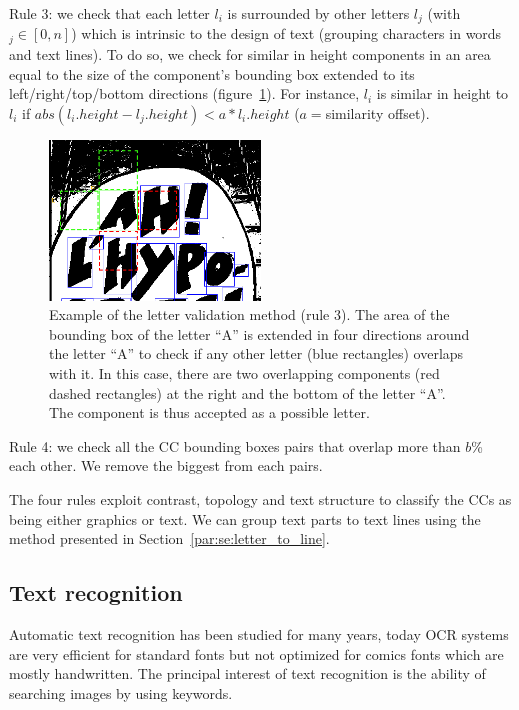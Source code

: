 Rule 3: we check that each letter $l_i$ is surrounded by other letters $l_j$ (with $_j\in{[0,n]}$) which is intrinsic to the design of text (grouping characters in words and text lines).
To do so, we check for similar in height components in an area equal to the size of the component's bounding box extended to its left/right/top/bottom directions (figure~\ref{fig:in:4_direction}). For instance, $l_i$ is similar in height to $l_i$ if $abs(l_i.height - l_j.height)<a*l_i.height$ ($a=$similarity offset). %


	\begin{figure}[h!]	%
	  \centering
		\includegraphics[width=0.50\textwidth]{4_direction.png}
		\caption[Text extraction neighbourhood validation]{Example of the letter validation method (rule 3). The area of the bounding box of the letter ``A'' is extended in four directions around the letter ``A'' to check if any other letter (blue rectangles) overlaps with it. In this case, there are two overlapping components (red dashed rectangles) at the right and the bottom of the letter ``A''. The component is thus accepted as a possible letter.}
		\label{fig:in:4_direction}
	\end{figure}

Rule 4:
we check all the CC bounding boxes pairs that overlap more than $b$\% each other. We remove the biggest from each pairs.

The four rules exploit contrast, topology and text structure to classify the CCs as being either graphics or text.
We can group text parts to text lines using the method presented in Section~\ref{par:se:letter_to_line}.


\subsection{Text recognition} %
\label{sub:te:text_recognition}
Automatic text recognition has been studied for many years, today OCR systems are very efficient for standard fonts but not optimized for comics fonts which are mostly handwritten.
The principal interest of text recognition is the ability of searching images by using keywords.

